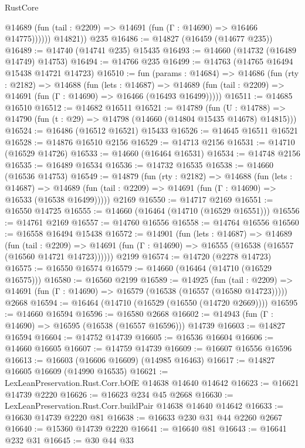 \begin{lexlean}{RustCore}
\begin{coremodule}
              @14689 (fun (tail : @2209) => @14691 (fun (Γ : @14690) => @16466 @14775))))))
        @14821))
    @235
@16486 := @14827 (@16459 (@14677 @235))
@16489 := @14740 (@14741 @235) @15435
@16493 := @14660 (@14732 (@16489 @14749) @14753)
@16494 := @14766 @235
@16499 := @14763 (@14765 @16494 @15438 @14721 @14723)
@16510 := fun (params : @14684) =>
  @14686
    (fun (rty : @2182) =>
    @14688
      (fun (lets : @14687) =>
      @14689 (fun (tail : @2209) => @14691 (fun (Γ : @14690) => @16466 (@16493 @16499)))))
@16511 := @14685 @16510
@16512 := @14682 @16511
@16521 := @14789
    (fun (U : @14788) => @14790 (fun (t : @29) => @14798 (@14660 (@14804 @15435 @14678) @14815)))
@16524 := @16486 (@16512 @16521) @15433
@16526 := @14645 @16511 @16521
@16528 := @14876 @16510 @2156
@16529 := @14713 @2156
@16531 := @14710 (@16529 @14726)
@16533 := @14660 (@16464 @16531)
@16534 := @14748 @2156
@16535 := @16489 @16534
@16536 := @14732 @16535
@16538 := @14660 (@16536 @14753)
@16549 := @14879
    (fun (rty : @2182) =>
    @14688
      (fun (lets : @14687) =>
      @14689 (fun (tail : @2209) => @14691 (fun (Γ : @14690) => @16533 (@16538 @16499)))))
    @2169
@16550 := @14717 @2169
@16551 := @16550 @14725
@16555 := @14660 (@16464 (@14710 (@16529 @16551)))
@16556 := @14761 @2169
@16557 := @14760 @16556
@16558 := @14764 @16556
@16560 := @16558 @16494 @15438
@16572 := @14901
    (fun (lets : @14687) =>
    @14689
      (fun (tail : @2209) =>
      @14691 (fun (Γ : @14690) => @16555 (@16538 (@16557 (@16560 @14721 @14723))))))
    @2199
@16574 := @14720 (@2278 @14723)
@16575 := @16550 @16574
@16579 := @14660 (@16464 (@14710 (@16529 @16575)))
@16580 := @16560 @2199
@16589 := @14925
    (fun (tail : @2209) => @14691 (fun (Γ : @14690) => @16579 (@16538 (@16557 (@16580 @14723)))))
    @2668
@16594 := @16464 (@14710 (@16529 (@16550 (@14720 @2669))))
@16595 := @14660 @16594
@16596 := @16580 @2668
@16602 := @14943 (fun (Γ : @14690) => @16595 (@16538 (@16557 @16596))) @14739
@16603 := @14827 @16594
@16604 := @14752 @14739
@16605 := @16536 @16604
@16606 := @14660 @16605
@16607 := @14759 @14739
@16609 := @16607 @16556 @16596
@16613 := @16603 (@16606 @16609) (@14985 @16463)
@16617 := @14827 @16605 @16609 (@14990 @16535)
@16621 := LexLeanPreservation.Rust.Corr.bOfE @14638 @14640 @14642
@16623 := @16621 @14739 @2220
@16626 := @16623 @234 @45 @2668
@16630 := LexLeanPreservation.Rust.Corr.buildPair @14638 @14640 @14642
@16633 := @16630 @14739 @2220 @81
@16638 := @16633 @230 @31 @44 @2260 @2667
@16640 := @15360 @14739 @2220
@16641 := @16640 @81
@16643 := @16641 @232 @31
@16645 := @30 @44 @33

\end{coremodule}
\end{lexlean}
